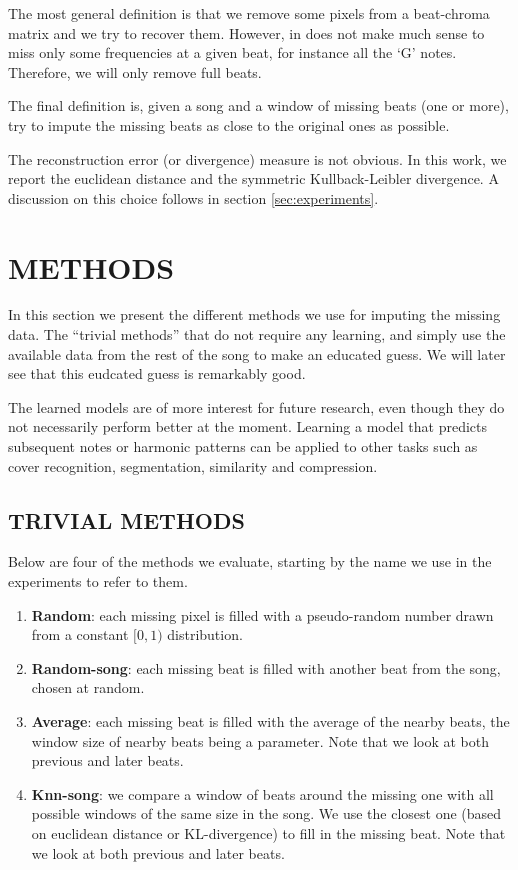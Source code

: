 \documentclass{article}
\begin{document}
The most general definition is that we remove some pixels from a beat-chroma matrix and
we try to recover them. However, in does not make much sense to miss only some frequencies
at a given beat, for instance all the `G' notes. Therefore, we will only remove full
beats.

The final definition is, given a song and a window of missing beats (one or more),
try to impute the missing beats as close to the original ones as possible.

The reconstruction error (or divergence) measure is not obvious. In this work,
we report the euclidean distance and the symmetric Kullback-Leibler divergence.
A discussion on this choice follows in section \ref{sec:experiments}.


\section{METHODS}
\label{sec:methods}
In this section we present the different methods we use for imputing the missing data.
The ``trivial methods'' that do not require any learning, and simply use the available
data from the rest of the song to make an educated guess. We will later see that this
eudcated guess is remarkably good.

The learned models are of more interest for future research, even though they do not
necessarily perform better at the moment. Learning a model that predicts subsequent
notes or harmonic patterns can be applied to other tasks such as cover recognition,
segmentation, similarity and compression.

\subsection{TRIVIAL METHODS}
\label{ssec:trivialmethods}
Below are four of the methods we evaluate, starting by the name we use in the experiments
to refer to them.
\begin{enumerate}
\item \textbf{Random}: each missing pixel is filled with a pseudo-random number drawn from
a constant $[0,1)$ distribution.
\item \textbf{Random-song}: each missing beat is filled with another beat from the song,
chosen at random.
\item \textbf{Average}: each missing beat is filled with the average of the nearby beats,
the window size of nearby beats being a parameter. Note that we look at both previous and
later beats.
\item \textbf{Knn-song}: we compare a window of beats around the missing one with
all possible windows of the same size in the song. We use the closest one (based on euclidean
distance or KL-divergence) to fill in the missing beat. Note that we look at both
previous and later beats.
\end{enumerate}
\end{document}

